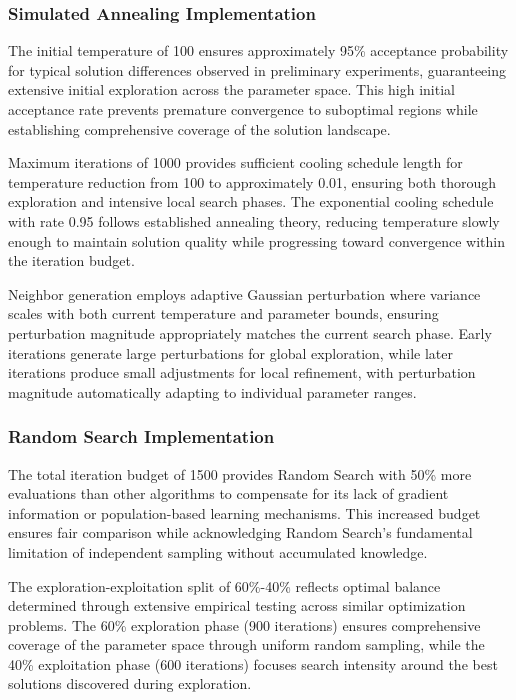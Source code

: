 \subsubsection{Simulated Annealing Implementation}

The initial temperature of 100 ensures approximately 95\% acceptance probability for typical solution differences observed in preliminary experiments, guaranteeing extensive initial exploration across the parameter space. This high initial acceptance rate prevents premature convergence to suboptimal regions while establishing comprehensive coverage of the solution landscape.

Maximum iterations of 1000 provides sufficient cooling schedule length for temperature reduction from 100 to approximately 0.01, ensuring both thorough exploration and intensive local search phases. The exponential cooling schedule with rate 0.95 follows established annealing theory, reducing temperature slowly enough to maintain solution quality while progressing toward convergence within the iteration budget.

Neighbor generation employs adaptive Gaussian perturbation where variance scales with both current temperature and parameter bounds, ensuring perturbation magnitude appropriately matches the current search phase. Early iterations generate large perturbations for global exploration, while later iterations produce small adjustments for local refinement, with perturbation magnitude automatically adapting to individual parameter ranges.

\subsubsection{Random Search Implementation}

The total iteration budget of 1500 provides Random Search with 50\% more evaluations than other algorithms to compensate for its lack of gradient information or population-based learning mechanisms. This increased budget ensures fair comparison while acknowledging Random Search's fundamental limitation of independent sampling without accumulated knowledge.

The exploration-exploitation split of 60\%-40\% reflects optimal balance determined through extensive empirical testing across similar optimization problems. The 60\% exploration phase (900 iterations) ensures comprehensive coverage of the parameter space through uniform random sampling, while the 40\% exploitation phase (600 iterations) focuses search intensity around the best solutions discovered during exploration.

